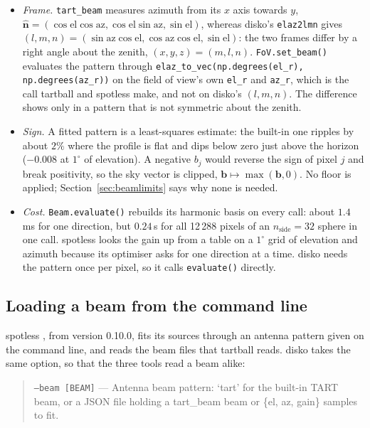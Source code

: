 \documentclass[11pt,a4paper]{article}
\newcommand{\bvec}{\boldsymbol{b}}
\begin{document}
\begin{itemize}
\item \emph{Frame.} \texttt{tart\_beam} measures azimuth from its $x$ axis
  towards $y$,
  $\hat{\boldsymbol{n}}=(\cos\mathrm{el}\cos\mathrm{az},
  \cos\mathrm{el}\sin\mathrm{az},\sin\mathrm{el})$, whereas disko's
  \texttt{elaz2lmn} gives
  $(l,m,n)=(\sin\mathrm{az}\cos\mathrm{el},\cos\mathrm{az}\cos\mathrm{el},
  \sin\mathrm{el})$: the two frames differ by a right angle about the zenith,
  $(x,y,z)=(m,l,n)$. \texttt{FoV.set\_beam()} evaluates the pattern through
  \texttt{elaz\_to\_vec(np.degrees(el\_r), np.degrees(az\_r))} on the field
  of view's own \texttt{el\_r} and \texttt{az\_r}, which is the call tartball
  and spotless make, and not on disko's $(l,m,n)$. The difference shows only
  in a pattern that is not symmetric about the zenith.
\item \emph{Sign.} A fitted pattern is a least-squares estimate: the built-in
  one ripples by about $2\%$ where the profile is flat and dips below zero
  just above the horizon ($-0.008$ at $1^{\circ}$ of elevation). A negative
  $b_j$ would reverse the sign of pixel $j$ and break positivity, so the sky
  vector is clipped, $\bvec\mapsto\max(\bvec,0)$. No floor is applied;
  Section~\ref{sec:beamlimits} says why none is needed.
\item \emph{Cost.} \texttt{Beam.evaluate()} rebuilds its harmonic basis on
  every call: about $1.4$\,ms for one direction, but $0.24$\,s for all
  12\,288 pixels of an $n_{\mathrm{side}}=32$ sphere in one call. spotless
  looks the gain up from a table on a $1^{\circ}$ grid of elevation and
  azimuth because its optimiser asks for one direction at a time. disko
  needs the pattern once per pixel, so it calls \texttt{evaluate()}
  directly.
\end{itemize}

\subsection{Loading a beam from the command line}
\label{sec:beamcli}

spotless \cite{spotless}, from version 0.10.0, fits its sources through an
antenna pattern given on the command line, and reads the beam files that
tartball \cite{tartball} reads. disko takes the same option, so that the
three tools read a beam alike:

\begin{quote}
\texttt{--beam [BEAM]} --- Antenna beam pattern: `tart' for the built-in
TART beam, or a JSON file holding a tart\_beam beam or \{el, az, gain\}
samples to fit.
\end{quote}
\end{document}
